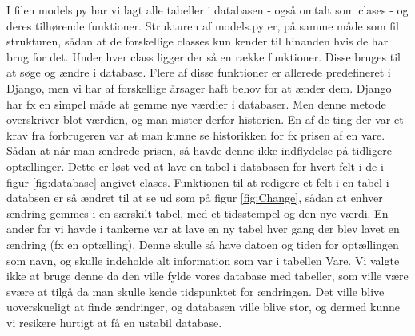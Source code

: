 \documentclass[]{article}
\begin{document}
I filen models.py har vi lagt alle tabeller i databasen - også omtalt som clases - og deres tilhørende funktioner. Strukturen af models.py er, på samme måde som fil strukturen, sådan at de forskellige classes kun kender til hinanden hvis de har brug for det. 
\noindent Under hver class ligger der så en række funktioner. Disse bruges til at søge og ændre i database. Flere af disse funktioner er allerede predefineret i Django, men vi har af forskellige årsager haft behov for at ænder dem.
\noindent Django har fx en simpel måde at gemme nye værdier i databaser. Men denne metode overskriver blot værdien, og man mister derfor historien. En af de ting der var et krav fra forbrugeren var at man kunne se historikken for fx prisen af en vare. Sådan at når man ændrede prisen, så havde denne ikke indflydelse på tidligere optællinger. Dette er løst ved at lave en tabel i databasen for hvert felt i de i figur \ref{fig:database} angivet clases. Funktionen til at redigere et felt i en tabel i databsen er så ændret til at se ud som på figur \ref{fig:Change}, sådan at enhver ændring gemmes i en særskilt tabel, med et tidsstempel og den nye værdi. En ander for vi havde i tankerne var at lave en ny tabel hver gang der blev lavet en ændring (fx en optælling). Denne skulle så have datoen og tiden for optællingen som navn, og skulle indeholde alt information som var i tabellen Vare. Vi valgte ikke at bruge denne da den ville fylde vores database med tabeller, som ville være svære at tilgå da man skulle kende tidspunktet for ændringen. Det ville blive uoverskueligt at finde ændringer, og databasen ville blive stor, og dermed kunne vi resikere hurtigt at få en ustabil database. 
\end{document}

